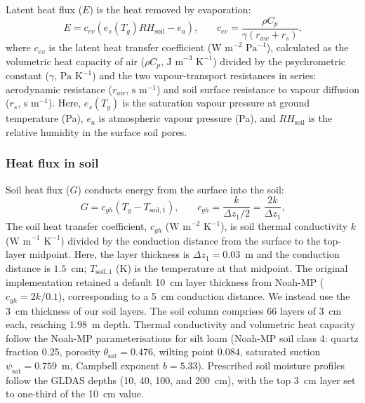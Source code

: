 \documentclass[12pt]{article}
\begin{document}
\noindent Latent heat flux ($E$) is the heat removed by evaporation:
\begin{equation}
E = c_{ev} (e_s(T_g) RH_{\textrm{soil}} - e_a)\textrm{,} \qquad c_{ev} = \frac{\rho C_p}{\gamma (r_{aw} + r_s)}\textrm{,}
\end{equation}
\noindent where $c_{ev}$ is the latent heat transfer coefficient ($\textrm{W m}^{-2}\textrm{ Pa}^{-1}$), calculated as the volumetric heat capacity of air ($\rho C_p$, $\textrm{J m}^{-3}\textrm{ K}^{-1}$) divided by the psychrometric constant ($\gamma$, $\textrm{Pa K}^{-1}$) and the two vapour-transport resistances in series: aerodynamic resistance ($r_{aw}$, $\textrm{s m}^{-1}$) and soil surface resistance to vapour diffusion ($r_s$, $\textrm{s m}^{-1}$). Here, $e_s(T_g)$ is the saturation vapour pressure at ground temperature (Pa), $e_a$ is atmospheric vapour pressure (Pa), and $RH_{\textrm{soil}}$ is the relative humidity in the surface soil pores.

\subsubsection{Heat flux in soil}

\noindent Soil heat flux ($G$) conducts energy from the surface into the soil:
\begin{equation} \label{eq:G}
G = c_{gh} (T_g - T_{\textrm{soil},1})\textrm{,} \qquad c_{gh} = \frac{k}{\Delta z_1 / 2} = \frac{2k}{\Delta z_1}\textrm{,}
\end{equation}
\noindent The soil heat transfer coefficient, $c_{gh}$ ($\textrm{W m}^{-2}\textrm{ K}^{-1}$), is soil thermal conductivity $k$ ($\textrm{W m}^{-1}\textrm{ K}^{-1}$) divided by the conduction distance from the surface to the top-layer midpoint. Here, the layer thickness is $\Delta z_1 = 0.03$~m and the conduction distance is $1.5$~cm; $T_{\textrm{soil},1}$ (K) is the temperature at that midpoint. The original implementation \citep{Itzkovitch2025} retained a default 10~cm layer thickness from Noah-MP ($c_{gh} = 2k / 0.1$), corresponding to a 5~cm conduction distance. We instead use the 3~cm thickness of our soil layers. The soil column comprises 66 layers of $3$~cm each, reaching $1.98$~m depth. Thermal conductivity and volumetric heat capacity follow the Noah-MP parameterisations \citep{niu_2011} for silt loam (Noah-MP soil class 4: quartz fraction $0.25$, porosity $\theta_{\textrm{sat}} = 0.476$, wilting point $0.084$, saturated suction $\psi_{\textrm{sat}} = 0.759$~m, Campbell exponent $b = 5.33$). Prescribed soil moisture profiles follow the GLDAS depths (10, 40, 100, and 200~cm), with the top 3~cm layer set to one-third of the 10~cm value.
\end{document}

